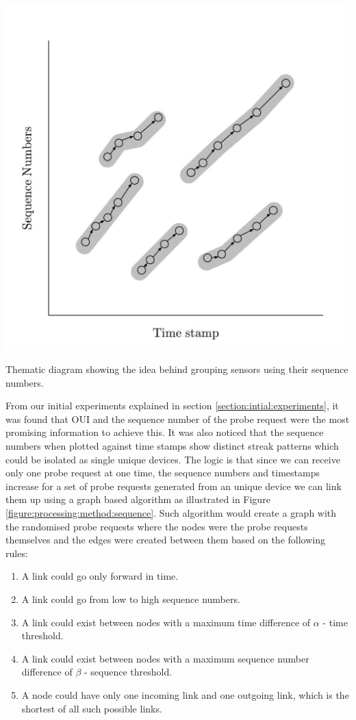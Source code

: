 \begin{marginfigure}
  \includegraphics[trim={5 5 5 5}, clip]{images/processing-method-sequence.jpg}
  \caption{Thematic diagram showing the idea behind grouping sensors using their sequence numbers.}
  \label{figure:processing:method:sequence}
\end{marginfigure}

From our initial experiments explained in section \ref{section:intial:experiments}, it was found that OUI and the sequence number of the probe request were the most promising information to achieve this.
It was also noticed that the sequence numbers when plotted against time stamps show distinct streak patterns which could be isolated as single unique devices.
The logic is that since we can receive only one probe request at one time, the sequence numbers and timestamps increase for a set of probe requests generated from an unique device we can link them up using a graph based algorithm as illustrated in Figure \ref{figure:processing:method:sequence}.
Such algorithm would create a graph with the randomised probe requests where the nodes were the probe requests themselves and the edges were created between them based on the following rules:

\begin{enumerate}[rightmargin=3em, leftmargin=3em] 
  \itemsep-0.5em
  \item A link could go only forward in time.
  \item A link could go from low to high sequence numbers. 
  \item A link could exist between nodes with a maximum time difference of $\alpha$ - time threshold.
  \item A link could exist between nodes with a maximum sequence number difference of $\beta$ - sequence threshold.
  \item A node could have only one incoming link and one outgoing link, which is the shortest of all such possible links.
\end{enumerate}

